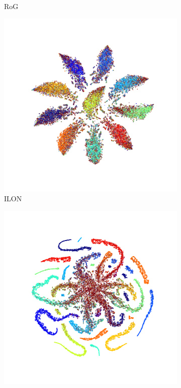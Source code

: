 \documentclass[12pt]{article}
\begin{document}
\begin{figure}[t]
\begin{subfigure}{.18\textwidth}
      \caption*{RoG~}
    \end{subfigure}
    \begin{subfigure}{.18\textwidth}
      \centering
      \includegraphics[width=\linewidth]{images/tsne/tsne_ILON_imagenet32.png}
      \caption*{ILON~}
    \end{subfigure}
    \begin{subfigure}{.18\textwidth}
      \centering
     \includegraphics[width=\linewidth]{images/tsne/tsne_ROG_cifar100.png}

\end{subfigure}
\end{figure}
\end{document}
